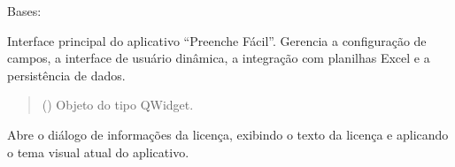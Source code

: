 \documentclass[letterpaper,10pt,english]{sphinxmanual}
\begin{document}

\begin{fulllineitems}
\label{\detokenize{api/app:app.App}}
\pysigstartsignatures
\pysiglinewithargsret
{}
{\sphinxparamcomma {}}
{}
\pysigstopsignatures
\sphinxAtStartPar
Bases: 

\sphinxAtStartPar
Interface principal do aplicativo “Preenche Fácil”.
Gerencia a configuração de campos, a interface de usuário dinâmica,
a integração com planilhas Excel e a persistência de dados.
\begin{quote}\begin{description}
\sphinxAtStartPar
{} () \textendash{} Objeto do tipo QWidget.

\end{description}\end{quote}

\begin{fulllineitems}
\label{\detokenize{api/app:app.App.open_license}}
\pysigstartsignatures
\pysiglinewithargsret
{}
{}
{}
\pysigstopsignatures
\sphinxAtStartPar
Abre o diálogo de informações da licença, exibindo o texto da licença
e aplicando o tema visual atual do aplicativo.
\begin{quote}\begin{description}
\sphinxAtStartPar
{}

\end{description}\end{quote}

\end{fulllineitems}



\end{fulllineitems}
\end{document}
